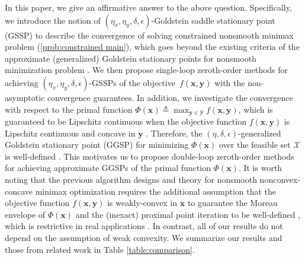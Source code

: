 \documentclass[11pt]{article}
\def\vx{\mathbf{x}}
\def\vy{\mathbf{y}}
\def\fX{{\mathcal{X}}}
\begin{document}
In this paper, we give an affirmative answer to the above question.
Specifically, we introduce the notion of $(\eta_x,\eta_y,\delta,\epsilon)$-Goldstein saddle stationary point (GSSP) to describe the convergence of solving constrained nonsmooth minimax problem (\ref{prob:constrained main}), 
which goes beyond the existing criteria of the approximate (generalized) Goldstein stationary points for nonsmooth minimization problem \citep{liu2024zeroth,zhang2020complexity,lin2022gradient}.
We then propose single-loop zeroth-order methods for achieving $(\eta_x,\eta_y,\delta,\epsilon)$-GSSPs of the objective~$f(\vx,\vy)$ with the non-asymptotic convergence guarantees. 
In addition, we investigate the convergence with respect to the primal function $\Phi(\vx) \triangleq \max_{\vy \in \mathcal{Y}} f(\vx, \vy)$, which is guaranteed to be Lipschitz continuous when the objective function $f(\vx,\vy)$ is Lipschitz continuous and concave in $\vy$ \citep{lin2020gradient}.
Therefore, the $(\eta,\delta,\epsilon)$-generalized Goldstein stationary point (GGSP) for minimizing $\Phi(\vx)$ over the feasible set $\fX$ is well-defined \citep{liu2024zeroth}.
This motivates us to propose double-loop zeroth-order methods for achieving approximate GGSPs of the primal function $\Phi(\vx)$.
It is worth noting that the previous algorithm designs and theory for nonsmooth nonconvex-concave minimax optimization requires the additional assumption that the objective function $f(\vx,\vy)$ is weakly-convex in $\vx$ to guarantee the Moreau envelope of $\Phi(\vx)$ and the (inexact) proximal point iteration to be well-defined \citep{lin2025two,boct2023alternating}, which  
is restrictive in real applications  \citep{nair2010rectified,zhang2020complexity}.
In contrast, all of our results do not depend on the assumption of weak convexity.
We summarize our results and those from related work in Table \ref{table:comparison}.
\end{document}
